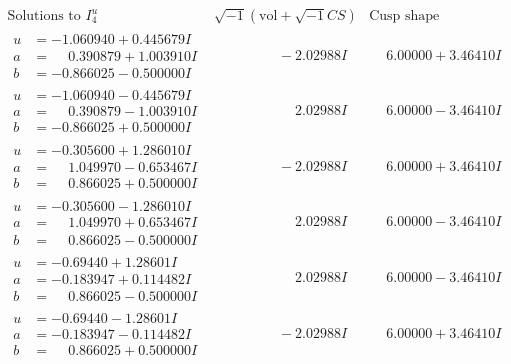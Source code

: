 \documentclass[1p]{elsarticle_modified}
\theoremstyle{definition}
\newcommand{\I}{\sqrt{-1}}
\begin{document}
$$\begin{array}{c|c|c}  
\text{Solutions to }I^u_{4}& \I (\text{vol} + \sqrt{-1}CS) & \text{Cusp shape}\\
 \hline 
\begin{aligned}
u &= -1.060940 + 0.445679 I \\
a &= \phantom{-}0.390879 + 1.003910 I \\
b &= -0.866025 - 0.500000 I\end{aligned}
 & \phantom{-0.000000 } -2.02988 I & \phantom{-}6.00000 + 3.46410 I \\ \hline\begin{aligned}
u &= -1.060940 - 0.445679 I \\
a &= \phantom{-}0.390879 - 1.003910 I \\
b &= -0.866025 + 0.500000 I\end{aligned}
 & \phantom{-0.000000 -}2.02988 I & \phantom{-}6.00000 - 3.46410 I \\ \hline\begin{aligned}
u &= -0.305600 + 1.286010 I \\
a &= \phantom{-}1.049970 - 0.653467 I \\
b &= \phantom{-}0.866025 + 0.500000 I\end{aligned}
 & \phantom{-0.000000 } -2.02988 I & \phantom{-}6.00000 + 3.46410 I \\ \hline\begin{aligned}
u &= -0.305600 - 1.286010 I \\
a &= \phantom{-}1.049970 + 0.653467 I \\
b &= \phantom{-}0.866025 - 0.500000 I\end{aligned}
 & \phantom{-0.000000 -}2.02988 I & \phantom{-}6.00000 - 3.46410 I \\ \hline\begin{aligned}
u &= -0.69440 + 1.28601 I \\
a &= -0.183947 + 0.114482 I \\
b &= \phantom{-}0.866025 - 0.500000 I\end{aligned}
 & \phantom{-0.000000 -}2.02988 I & \phantom{-}6.00000 - 3.46410 I \\ \hline\begin{aligned}
u &= -0.69440 - 1.28601 I \\
a &= -0.183947 - 0.114482 I \\
b &= \phantom{-}0.866025 + 0.500000 I\end{aligned}
 & \phantom{-0.000000 } -2.02988 I & \phantom{-}6.00000 + 3.46410 I \\ \hline\begin{aligned}

\end{aligned}
\end{array}$$
\end{document}
